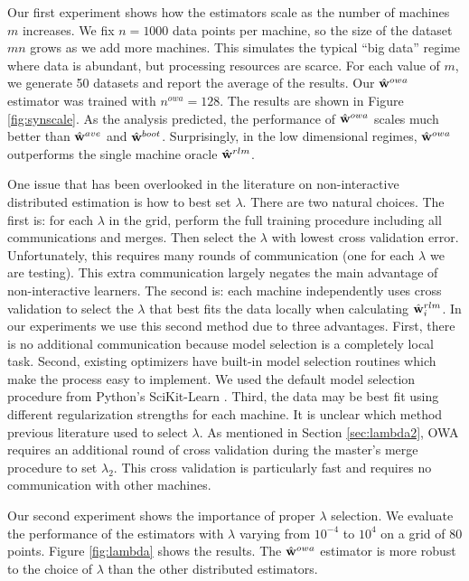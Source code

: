 \documentclass[thesis.tex]{subfiles}
\newcommand{\nowa}{n^{\textit{owa}}}
\begin{document}
Our first experiment shows how the estimators scale as the number of machines $m$ increases.
We fix $n=1000$ data points per machine,
so the size of the dataset $mn$ grows as we add more machines.
This simulates the typical ``big data'' regime where data is abundant,
but processing resources are scarce.
For each value of $m$, we generate 50 datasets and report the average of the results.
Our $\hat{\mathbf w}^{owa}$ estimator was trained with $\nowa=128$.
The results are shown in Figure \ref{fig:synscale}.
As the analysis predicted, the performance of $\hat{\mathbf w}^{owa}$ scales much better than $\hat{\mathbf w}^{ave}$ and $\hat{\mathbf w}^{boot}$.
Surprisingly, in the low dimensional regimes, $\hat{\mathbf w}^{owa}$ outperforms the single machine oracle $\hat{\mathbf w}^{rlm}$.

One issue that has been overlooked in the literature on non-interactive distributed estimation is how to best set $\lambda$.
There are two natural choices. %
The first is: for each $\lambda$ in the grid, perform the full training procedure including all communications and merges.
Then select the $\lambda$ with lowest cross validation error.
Unfortunately, this requires many rounds of communication (one for each $\lambda$ we are testing).
This extra communication largely negates the main advantage of non-interactive learners.
The second is: each machine independently uses cross validation to select the $\lambda$ that best fits the data locally when calculating $\hat{\mathbf w}^{rlm}_i$.
In our experiments we use this second method due to three advantages.
First, there is no additional communication because model selection is a completely local task.
Second, existing optimizers have built-in model selection routines which make the process easy to implement.
We used the default model selection procedure from Python's SciKit-Learn \citep{scikit-learn}.
Third, the data may be best fit using different regularization strengths for each machine.
It is unclear which method previous literature used to select $\lambda$.
As mentioned in Section \ref{sec:lambda2}, OWA requires an additional round of cross validation during the master's merge procedure to set $\lambda_2$.
This cross validation is particularly fast and requires no communication with other machines.

Our second experiment shows the importance of proper $\lambda$ selection.
We evaluate the performance of the estimators with $\lambda$ varying from $10^{-4}$ to $10^4$ on a grid of 80 points.
Figure \ref{fig:lambda} shows the results. 
The $\hat{\mathbf w}^{owa}$ estimator is more robust to the choice of $\lambda$ than the other distributed estimators.
\end{document}
